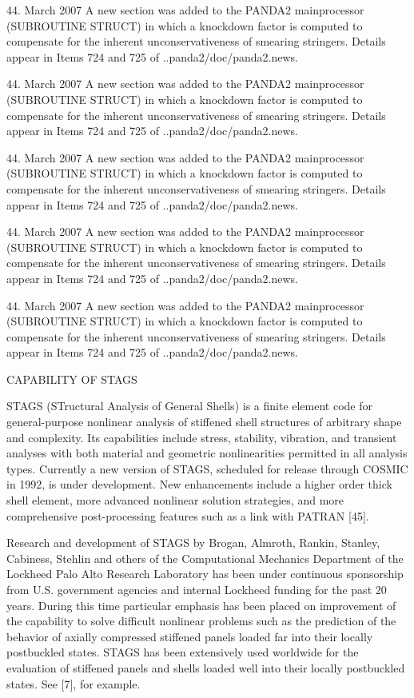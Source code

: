 44. March 2007
A new section was added to the PANDA2 mainprocessor (SUBROUTINE STRUCT) in
which a knockdown factor is computed to compensate for the inherent
unconservativeness of smearing stringers. Details appear in Items 724 and
725 of ..panda2/doc/panda2.news.

44. March 2007
A new section was added to the PANDA2 mainprocessor (SUBROUTINE STRUCT) in
which a knockdown factor is computed to compensate for the inherent
unconservativeness of smearing stringers. Details appear in Items 724 and
725 of ..panda2/doc/panda2.news.

44. March 2007
A new section was added to the PANDA2 mainprocessor (SUBROUTINE STRUCT) in
which a knockdown factor is computed to compensate for the inherent
unconservativeness of smearing stringers. Details appear in Items 724 and
725 of ..panda2/doc/panda2.news.

44. March 2007
A new section was added to the PANDA2 mainprocessor (SUBROUTINE STRUCT) in
which a knockdown factor is computed to compensate for the inherent
unconservativeness of smearing stringers. Details appear in Items 724 and
725 of ..panda2/doc/panda2.news.

44. March 2007
A new section was added to the PANDA2 mainprocessor (SUBROUTINE STRUCT) in
which a knockdown factor is computed to compensate for the inherent
unconservativeness of smearing stringers. Details appear in Items 724 and
725 of ..panda2/doc/panda2.news.


                         CAPABILITY OF STAGS

STAGS (STructural Analysis of General Shells) is a finite element code for
general-purpose nonlinear analysis of stiffened shell structures of
arbitrary shape and complexity. Its capabilities include stress,
stability, vibration, and transient analyses with both material and
geometric nonlinearities permitted in all analysis types. Currently a new
version of STAGS, scheduled for release through COSMIC in 1992, is under
development. New enhancements include a higher order thick shell element,
more advanced nonlinear solution strategies, and more comprehensive
post-processing features such as a link with PATRAN [45]. 

Research and development of STAGS by Brogan, Almroth, Rankin, Stanley,
Cabiness, Stehlin and others of the Computational Mechanics Department of
the Lockheed Palo Alto Research Laboratory has been under continuous
sponsorship from U.S. government agencies and internal Lockheed funding
for the past 20 years.  During this time particular emphasis has been
placed on improvement of the capability to solve difficult nonlinear
problems such as the prediction of the behavior of axially compressed
stiffened panels loaded far into their locally postbuckled states. STAGS
has been extensively used worldwide for the evaluation of stiffened panels
and shells loaded well into their locally postbuckled states. See [7], for
example. 

